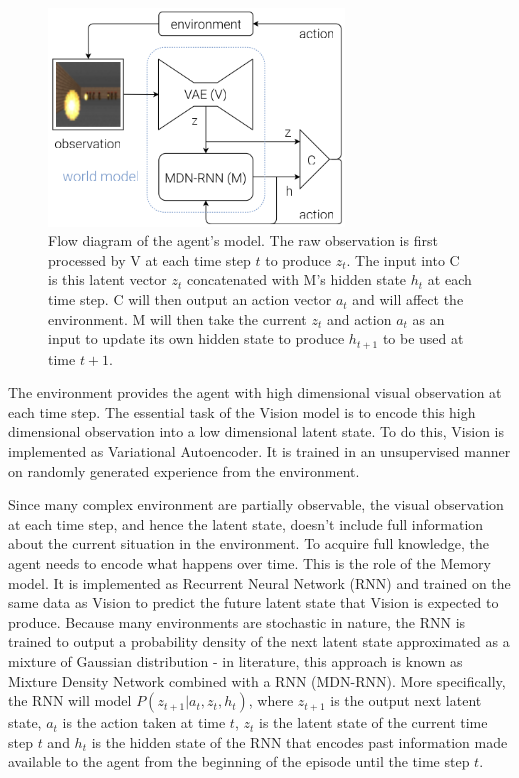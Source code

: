 \begin{figure}[H]
\includegraphics[width=0.7\textwidth,keepaspectratio]{figures/WorldModels.png}
\caption[Flow diagram of the World Models agent's model]{Flow diagram of the agent's model\protect\cite{Algo.WorldModels}. The raw observation is first processed by V at each time step $t$ to produce $z_t$. The input into C is this latent vector $z_t$ concatenated with M’s hidden state $h_t$ at each time step. C will then output an action vector $a_t$ and will affect the environment. M will then take the current $z_t$ and action $a_t$ as an input to update its own hidden state to produce $h_{t+1}$ to be used at time $t + 1$.}
\label{Fig.WorldModels}
\end{figure}

The environment provides the agent with high dimensional visual observation at each time step. The essential task of the Vision model is to encode this high dimensional observation into a low dimensional latent state. To do this, Vision is implemented as Variational Autoencoder\cite{Algo.VAE}. It is trained in an unsupervised manner on randomly generated experience from the environment.

Since many complex environment are partially observable, the visual observation at each time step, and hence the latent state, doesn't include full information about the current situation in the environment. To acquire full knowledge, the agent needs to encode what happens over time. This is the role of the Memory model. It is implemented as Recurrent Neural Network\cite{Algo.LSTM} (RNN) and trained on the same data as Vision to predict the future latent state that Vision is expected to produce. Because many environments are stochastic in nature, the RNN is trained to output a probability density of the next latent state approximated as a mixture of Gaussian distribution - in literature, this approach is known as Mixture Density Network combined with a RNN (MDN-RNN)\cite{Algo.MDNRNN}. More specifically, the RNN will model $P(z_{t+1}|a_t,z_t,h_t)$, where $z_{t+1}$ is the output next latent state, $a_t$ is the action taken at time $t$, $z_t$ is the latent state of the current time step $t$ and $h_t$ is the hidden state of the RNN that encodes past information made available to the agent from the beginning of the episode until the time step $t$.

